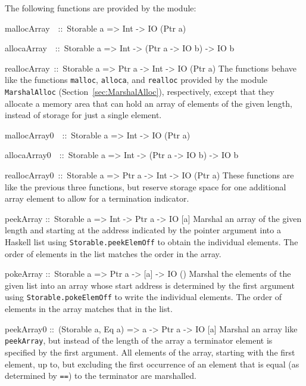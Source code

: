 \documentclass[a4paper,twosides]{article}
\makeatletter
\newcommand{\code}[1]{\texttt{#1}}      %
\newenvironment{codedesc}{%
  \list{}{\labelwidth\z@
    \let\makelabel\codedesclabel}
  }{%
  \endlist
  }
\newcommand*{\codedesclabel}[1]{%
  \hspace{-\leftmargin}
  \parbox[b]{\labelwidth}{\makebox[0pt][l]{\code{#1}}\\}\hfil\relax
  }
\newcommand{\combineitems}{\vspace*{-\itemsep}\vspace*{-\parsep}\vspace*{-1em}}
\makeatother
\begin{document}
The following functions are provided by the module:
%
\begin{codedesc}
\item[mallocArray~~::\ Storable a => Int -> IO (Ptr a)]
\item[allocaArray~~::\ Storable a => Int -> (Ptr a -> IO b) -> IO b]
  \combineitems
\item[reallocArray~::\ Storable a => Ptr a -> Int -> IO (Ptr a)]\combineitems
  The functions behave like the functions \code{malloc}, \code{alloca}, and
  \code{realloc} provided by the module \code{MarshalAlloc}
  (Section~\ref{sec:MarshalAlloc}), respectively, except that they allocate a
  memory area that can hold an array of elements of the given length, instead
  of storage for just a single element.  

\item[mallocArray0~~::\ Storable a => Int -> IO (Ptr a)]
\item[allocaArray0~~::\ Storable a => Int -> (Ptr a -> IO b) -> IO b]\combineitems
\item[reallocArray0~::\ Storable a => Ptr a -> Int -> IO (Ptr a)]\combineitems
  These functions are like the previous three functions, but reserve storage
  space for one additional array element to allow for a termination indicator.
  
\item[peekArray ::\ Storable a => Int -> Ptr a -> IO {[a]}] Marshal an array of
  the given length and starting at the address indicated by the pointer
  argument into a Haskell list using \code{Storable.peekElemOff} to obtain the
  individual elements.  The order of elements in the list matches the order in
  the array.
  
\item[pokeArray ::\ Storable a => Ptr a -> {[a]} -> IO ()] Marshal the elements
  of the given list into an array whose start address is determined by the
  first argument using \code{Storable.pokeElemOff} to write the individual
  elements.  The order of elements in the array matches that in the list.
  
\item[peekArray0 ::\ (Storable a, Eq a) => a -> Ptr a -> IO {[a]}] Marshal an
  array like \code{peekArray}, but instead of the length of the array a
  terminator element is specified by the first argument.  All elements of the
  array, starting with the first element, up to, but excluding the first
  occurrence of an element that is equal (as determined by \code{==}) to the
  terminator are marshalled.


\end{codedesc}
\end{document}
